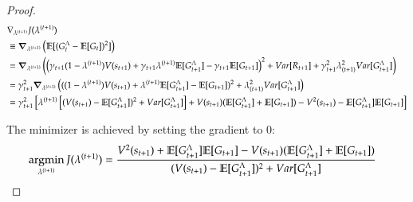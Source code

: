 \begin{proof}
\begin{equation}
\begin{aligned}
& \nabla_{\lambda^{(t+1)}} J(\lambda^{(t+1)})\\
& \equiv \bm{\nabla}_{\lambda^{(t+1)}} \left(\mathbb{E}[(G_t^\Lambda - \mathbb{E}[G_t])^2] \right)\\
& = \bm{\nabla}_{\lambda^{(t+1)}} \left(\left(\gamma_{t+1} (1 - \lambda^{(t+1)})V(s_{t+1}) + \gamma_{t+1} \lambda^{(t+1)} \mathbb{E}[G_{t+1}^\Lambda] - \gamma_{t+1} \mathbb{E}[G_{t+1}]\right)^2 + Var[R_{t+1}] + \gamma_{t+1}^2 \lambda_{(t+1)}^2Var[G_{t+1}^\Lambda]\right)\\
& = \gamma_{t+1}^2 \bm{\nabla}_{\lambda^{(t+1)}} \left(((1 - \lambda^{(t+1)})V(s_{t+1}) + \lambda^{(t+1)} \mathbb{E}[G_{t+1}^\Lambda] -  \mathbb{E}[G_{t+1}])^2 + \lambda_{(t+1)}^2Var[G_{t+1}^\Lambda]\right)\\
& = \gamma_{t+1}^2 \left[\lambda^{(t+1)} \left[ (V(s_{t+1}) - \mathbb{E}[G_{t+1}^\Lambda])^2 + Var[G_{t+1}^\Lambda] \right] + V(s_{t+1})(\mathbb{E}[G_{t+1}^\Lambda] + \mathbb{E}[G_{t+1}]) - V^2(s_{t+1}) - \mathbb{E}[G_{t+1}^\Lambda]\mathbb{E}[G_{t+1}]\right]
\end{aligned}
\nonumber
\end{equation}

The minimizer is achieved by setting the gradient to $0$:
\begin{equation}
\begin{aligned}
& \operatorname*{argmin}_{\lambda^{(t+1)}}{J(\lambda^{(t+1)})} = \frac{V^2(s_{t+1}) + \mathbb{E}[G_{t+1}^\Lambda]\mathbb{E}[G_{t+1}]-V(s_{t+1})(\mathbb{E}[G_{t+1}^\Lambda] + \mathbb{E}[G_{t+1}])}{(V(s_{t+1}) - \mathbb{E}[G_{t+1}^\Lambda])^2 + Var[G_{t+1}^\Lambda]}
\end{aligned}
\end{equation}
\end{proof}


